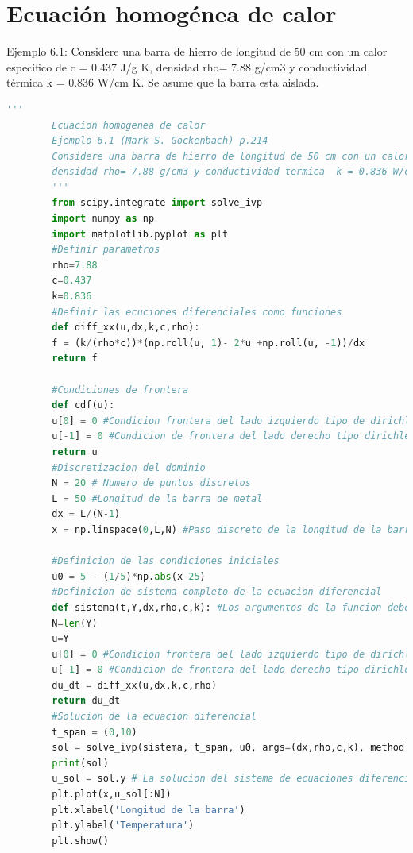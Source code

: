 \documentclass[12pt,letterpaper,final]{article}%
\begin{document}
\section{Ecuación homogénea de calor}
	Ejemplo 6.1:
	Considere una barra de hierro de longitud de 50 cm con un calor especifico de c = 0.437 J/g K, 
	densidad rho= 7.88 g/cm3 y conductividad térmica  k = 0.836 W/cm K. Se asume que la barra esta aislada\cite{Gockenbach2010}.
	\begin{lstlisting}[language=Python]
		'''
		Ecuacion homogenea de calor
		Ejemplo 6.1 (Mark S. Gockenbach) p.214
		Considere una barra de hierro de longitud de 50 cm con un calor especifico de c = 0.437 J/g K, 
		densidad rho= 7.88 g/cm3 y conductividad termica  k = 0.836 W/cm K. Se asume que la barra esta aislada
		'''
		from scipy.integrate import solve_ivp
		import numpy as np
		import matplotlib.pyplot as plt
		#Definir parametros
		rho=7.88
		c=0.437
		k=0.836
		#Definir las ecuciones diferenciales como funciones
		def diff_xx(u,dx,k,c,rho):
		f = (k/(rho*c))*(np.roll(u, 1)- 2*u +np.roll(u, -1))/dx
		return f
		
		#Condiciones de frontera 
		def cdf(u):
		u[0] = 0 #Condicion frontera del lado izquierdo tipo de dirichlet
		u[-1] = 0 #Condicion de frontera del lado derecho tipo dirichlet
		return u
		#Discretizacion del dominio
		N = 20 # Numero de puntos discretos
		L = 50 #Longitud de la barra de metal
		dx = L/(N-1)
		x = np.linspace(0,L,N) #Paso discreto de la longitud de la barra
		
		#Definicion de las condiciones iniciales
		u0 = 5 - (1/5)*np.abs(x-25)
		#Definicion de sistema completo de la ecuacion diferencial
		def sistema(t,Y,dx,rho,c,k): #Los argumentos de la funcion deben ir en el mismo orden
		N=len(Y)
		u=Y
		u[0] = 0 #Condicion frontera del lado izquierdo tipo de dirichlet
		u[-1] = 0 #Condicion de frontera del lado derecho tipo dirichlet
		du_dt = diff_xx(u,dx,k,c,rho)  
		return du_dt
		#Solucion de la ecuacion diferencial
		t_span = (0,10)
		sol = solve_ivp(sistema, t_span, u0, args=(dx,rho,c,k), method = 'RK45')
		print(sol)
		u_sol = sol.y # La solucion del sistema de ecuaciones diferenciales
		plt.plot(x,u_sol[:N])
		plt.xlabel('Longitud de la barra')
		plt.ylabel('Temperatura')
		plt.show()
	\end{lstlisting}	
	
\end{document}
